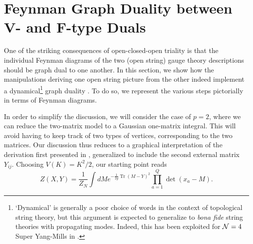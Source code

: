 \documentclass[english]{article}
\DeclareMathOperator{\Tr}{Tr}
\begin{document}
\section{Feynman Graph Duality between V- and F-type Duals}\label{sec:graphduality}

One of the striking consequences of open-closed-open triality is that the individual Feynman diagrams of the two (open string) gauge theory descriptions should be graph dual to one another. In this section, we show how the manipulations deriving one open string picture from the other indeed implement a dynamical\footnote{`Dynamical' is generally a poor choice of words in the context of topological string theory, but this argument is expected to generalize to {\it bona fide} string theories with propagating modes. Indeed, this has been exploited for ${\cal N}=4$ Super Yang-Mills in \cite{brown2011complex, octagon, komatsuOCO}.} graph duality \cite{Joburg}. To do so, we represent the various steps pictorially in terms of Feynman diagrams. 

In order to simplify the discussion, we will consider the case of $p=2$, where we can reduce the two-matrix model to a Gaussian one-matrix integral. This will avoid having to keep track of two types of vertices, corresponding to the two matrices. Our discussion thus reduces to a graphical interpretation \cite{Joburg} of the derivation first presented in \cite{exact}, generalized to include the second external matrix $Y_{ij}$. 
Choosing $V(K)= K^2/2$, our starting point reads 
\begin{equation} \label{eq:GaussianStart}
   Z(X,Y) =  \frac{1}{Z_{N}} \int dM e^{- \frac{1}{2g} \Tr \left( M-Y \right)^2} \prod_{a=1}^{Q} \det\left( x_a-M\right).
\end{equation}
\end{document}
